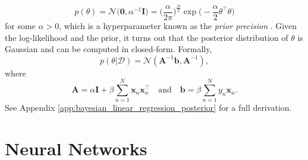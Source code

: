 \documentclass[msc,deptreport.inf]{infthesis} %
\newcommand{\matr}[1]{\mathbf{#1}}
\begin{document}
\begin{equation}\label{eqn:linear_regression_prior}
	p(\theta) 
	= \mathcal{N}\big(\matr{0}, \alpha^{-1} \matr{I} \big)
	= \Big(\frac{\alpha}{2\pi}\Big)^{\frac{D}{2}} \exp\Big(-\frac{\alpha}{2} \theta^\intercal \theta \Big)
\end{equation}
for some $\alpha > 0$, which is a hyperparameter known as the \emph{prior precision} \cite{barber2007}. Given the log-likelihood and the prior, it turns out that the posterior distribution of $\theta$ is Gaussian and can be computed in closed-form. Formally, 
\begin{equation}\label{eqn:linear_regression_posterior}
	p(\theta | \mathcal{D}) = \mathcal{N}(\matr{A}^{-1} \matr{b}, \matr{A}^{-1}),
\end{equation}
where
\begin{equation}\label{eqn:linear_model_A_and_b}
	\matr{A} = \alpha \matr{I} + \beta \sum_{n=1}^N \matr{x}_n \matr{x}_n^\intercal
	\quad \text{and} \quad 
	\matr{b} = \beta \sum_{n=1}^N y_n \matr{x}_n.
\end{equation}
See Appendix \ref{app:bayesian_linear_regression_posterior} for a full derivation.


\section{Neural Networks}
\end{document}
